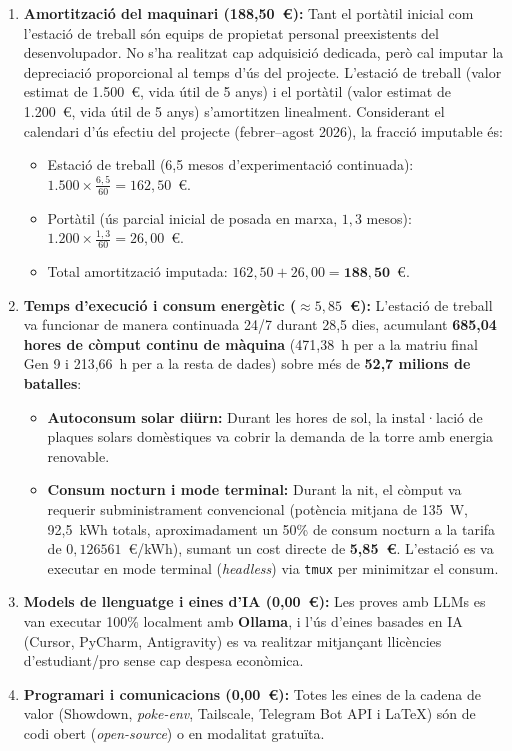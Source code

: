 \begin{enumerate}
    \item \textbf{Amortització del maquinari (188,50~€):} Tant el portàtil inicial com l'estació de treball són equips de propietat personal preexistents del desenvolupador. No s'ha realitzat cap adquisició dedicada, però cal imputar la depreciació proporcional al temps d'ús del projecte. L'estació de treball (valor estimat de 1.500~€, vida útil de 5 anys) i el portàtil (valor estimat de 1.200~€, vida útil de 5 anys) s'amortitzen linealment. Considerant el calendari d'ús efectiu del projecte (febrer--agost 2026), la fracció imputable és:
          \begin{itemize}
              \item Estació de treball (6,5 mesos d'experimentació continuada): $1.500 \times \frac{6{,}5}{60} = 162{,}50$~€.
              \item Portàtil (ús parcial inicial de posada en marxa, $1{,}3$ mesos): $1.200 \times \frac{1{,}3}{60} = 26{,}00$~€.
              \item Total amortització imputada: $162{,}50 + 26{,}00 = \mathbf{188{,}50}$~€.
          \end{itemize}
    \item \textbf{Temps d'execució i consum energètic ($\approx 5,85$~€):} L'estació de treball va funcionar de manera continuada 24/7 durant 28,5 dies, acumulant \textbf{685,04 hores de còmput continu de màquina} (471,38~h per a la matriu final Gen 9 i 213,66~h per a la resta de dades) sobre més de \textbf{52,7 milions de batalles}:
          \begin{itemize}
              \item \textbf{Autoconsum solar diürn:} Durant les hores de sol, la instal·lació de plaques solars domèstiques va cobrir la demanda de la torre amb energia renovable.
              \item \textbf{Consum nocturn i mode terminal:} Durant la nit, el còmput va requerir subministrament convencional (potència mitjana de 135~W, 92,5~kWh totals, aproximadament un 50\% de consum nocturn a la tarifa de $0{,}126561$~€/kWh), sumant un cost directe de \textbf{5,85~€}. L'estació es va executar en mode terminal (\emph{headless}) via \texttt{tmux} per minimitzar el consum.
          \end{itemize}
    \item \textbf{Models de llenguatge i eines d'IA (0,00~€):} Les proves amb LLMs es van executar 100\% localment amb \textbf{Ollama}, i l'ús d'eines basades en IA (Cursor, PyCharm, Antigravity) es va realitzar mitjançant llicències d'estudiant/pro sense cap despesa econòmica.
    \item \textbf{Programari i comunicacions (0,00~€):} Totes les eines de la cadena de valor (Showdown, \textit{poke-env}, Tailscale, Telegram Bot API i \LaTeX{}) són de codi obert (\emph{open-source}) o en modalitat gratuïta.
\end{enumerate}

